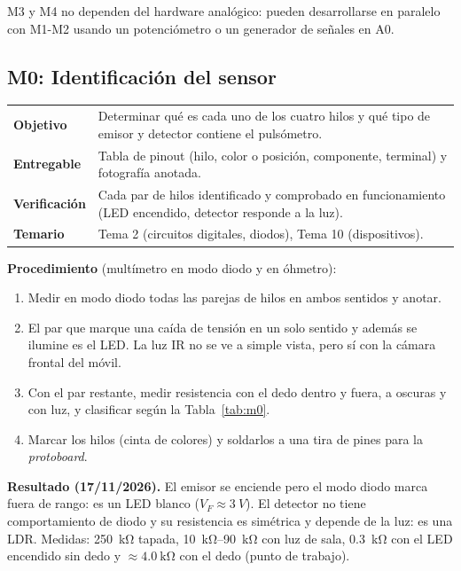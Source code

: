 \documentclass[11pt,a4paper]{article}
\newcommand{\modinfo}[4]{%
  \begin{center}\small
  \renewcommand{\arraystretch}{1.25}
  \begin{tabularx}{\textwidth}{>{\bfseries\color{navy}}lX}
  \toprule
  Objetivo     & #1 \\
  Entregable   & #2 \\
  Verificación & #3 \\
  Temario      & #4 \\
  \bottomrule
  \end{tabularx}
  \end{center}}
\begin{document}
M3 y M4 no dependen del hardware analógico: pueden desarrollarse en paralelo con M1-M2 usando
un potenciómetro o un generador de señales en A0.

\subsection{M0: Identificación del sensor}

\modinfo{Determinar qué es cada uno de los cuatro hilos y qué tipo de emisor y detector
contiene el pulsómetro.}
{Tabla de pinout (hilo, color o posición, componente, terminal) y fotografía anotada.}
{Cada par de hilos identificado y comprobado en funcionamiento (LED encendido, detector
responde a la luz).}
{Tema 2 (circuitos digitales, diodos), Tema 10 (dispositivos).}

\textbf{Procedimiento} (multímetro en modo diodo y en óhmetro):
\begin{enumerate}[leftmargin=1.4em,itemsep=2pt,topsep=2pt]
  \item Medir en modo diodo todas las parejas de hilos en ambos sentidos y anotar.
  \item El par que marque una caída de tensión en un solo sentido y además se ilumine es el
        LED. La luz IR no se ve a simple vista, pero sí con la cámara frontal del móvil.
  \item Con el par restante, medir resistencia con el dedo dentro y fuera, a oscuras y con
        luz, y clasificar según la Tabla~\ref{tab:m0}.
  \item Marcar los hilos (cinta de colores) y soldarlos a una tira de pines para la
        \emph{protoboard}.
\end{enumerate}

\textbf{Resultado (17/11/2026).} El emisor se enciende pero el modo diodo marca fuera de rango:
es un LED blanco ($V_F \approx \qty{3}{V}$). El detector no tiene comportamiento de diodo y su
resistencia es simétrica y depende de la luz: es una LDR. Medidas: \qty{250}{\kilo\ohm}
tapada, \qtyrange{10}{90}{\kilo\ohm} con luz de sala, \qty{0.3}{\kilo\ohm} con el LED
encendido sin dedo y $\approx \qty{4.0}{\kilo\ohm}$ con el dedo (punto de trabajo).
\end{document}
